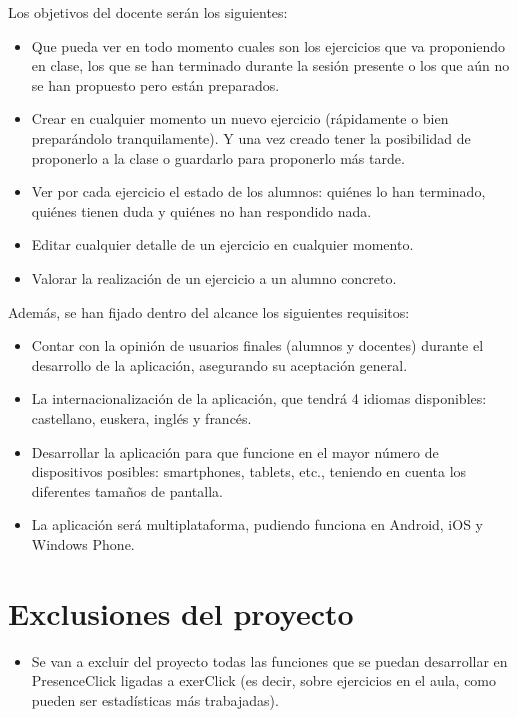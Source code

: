 Los objetivos del docente serán los siguientes:

\begin{itemize}
\item Que pueda ver en todo momento cuales son los ejercicios que va proponiendo en clase, los que se han terminado durante la sesión presente o los que aún no se han propuesto pero están preparados.
\item Crear en cualquier momento un nuevo ejercicio (rápidamente o bien preparándolo tranquilamente). Y una vez creado tener la posibilidad de proponerlo a la clase o guardarlo para proponerlo más tarde.
\item Ver por cada ejercicio el estado de los alumnos: quiénes lo han terminado, quiénes tienen duda y quiénes no han respondido nada.
\item Editar cualquier detalle de un ejercicio en cualquier momento.
\item Valorar la realización de un ejercicio a un alumno concreto.
\end{itemize}

Además, se han fijado dentro del alcance los siguientes requisitos:

\begin{itemize}
\item Contar con la opinión de usuarios finales (alumnos y docentes) durante el desarrollo de la aplicación, asegurando su aceptación general.
\item La internacionalización de la aplicación, que tendrá 4 idiomas disponibles: castellano, euskera, inglés y francés.
\item Desarrollar la aplicación para que funcione en el mayor número de dispositivos posibles: smartphones, tablets, etc., teniendo en cuenta los diferentes tamaños de pantalla.
\item La aplicación será multiplataforma, pudiendo funciona en Android, iOS y Windows Phone.
\end{itemize}

\section{Exclusiones del proyecto}

\begin{itemize}
\item Se van a excluir del proyecto todas las funciones que se puedan desarrollar en PresenceClick ligadas a exerClick (es decir, sobre ejercicios en el aula, como pueden ser estadísticas más trabajadas).
\end{itemize}
